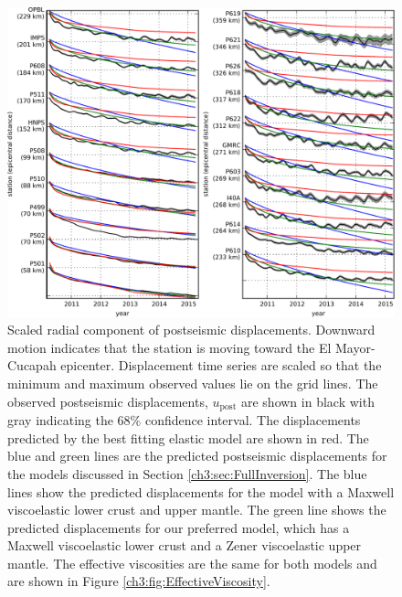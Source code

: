 \begin{figure}
\includegraphics[scale=0.9]{ch3/figures/2016jb013114-p07}
\caption{Scaled radial component of postseismic displacements.
Downward motion indicates that the station is moving toward the El
Mayor-Cucapah epicenter.  Displacement time series are scaled so that
the minimum and maximum observed values lie on the grid lines.  The
observed postseismic displacements, $u_\mathrm{post}$ are shown in
black with gray indicating the 68\% confidence interval.  The
displacements predicted by the best fitting elastic model are shown in
red.  The blue and green lines are the predicted postseismic
displacements for the models discussed in Section
\ref{ch3:sec:FullInversion}. The blue lines show the predicted
displacements for the model with a Maxwell viscoelastic lower crust
and upper mantle.  The green line shows the predicted displacements
for our preferred model, which has a Maxwell viscoelastic lower crust
and a Zener viscoelastic upper mantle.  The effective viscosities are
the same for both models and are shown in Figure
\ref{ch3:fig:EffectiveViscosity}.}
\label{ch3:fig:RecordSectionMain}
\end{figure}

